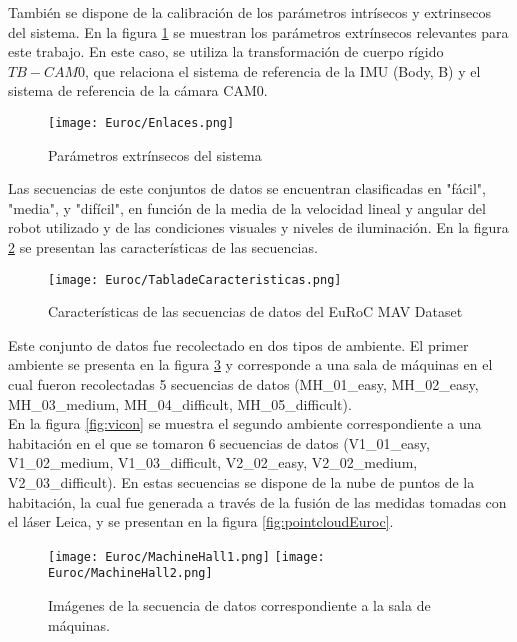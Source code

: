 También se dispone de la calibración de los parámetros intrísecos y extrinsecos del sistema. En la figura \ref{fig:extrinsecosEuroc} se muestran los parámetros extrínsecos relevantes para este trabajo. En este caso, se utiliza la transformación de cuerpo rígido $T{B-CAM0}$, que relaciona el sistema de referencia de la IMU (Body, B) y el sistema de referencia de la cámara CAM0. 



\begin{figure}[H]
	\centering
	\texttt{[image: Euroc/Enlaces.png]}
	\caption{Parámetros extrínsecos del sistema}
	\label{fig:extrinsecosEuroc}
\end{figure}

Las secuencias de este conjuntos de datos se encuentran clasificadas en "fácil", "media", y "difícil",  en función de la media de la velocidad lineal y angular del robot utilizado y de las condiciones visuales y niveles de iluminación. En la figura \ref{fig:tablaDeCaracteristicas} se presentan las características de las secuencias. 

\begin{figure}[H]
	\centering
	\texttt{[image: Euroc/TabladeCaracteristicas.png]}
	\caption{Características de las secuencias de datos del EuRoC MAV Dataset}
	\label{fig:tablaDeCaracteristicas}
\end{figure}



Este conjunto de datos fue recolectado en dos tipos de ambiente. El primer ambiente se presenta en la figura \ref{fig:machineHall} y  corresponde a una sala de máquinas en el cual fueron recolectadas 5 secuencias de datos (MH\_01\_easy, MH\_02\_easy, MH\_03\_medium, MH\_04\_difficult, MH\_05\_difficult). \\

En la figura \ref{fig:vicon} se muestra el segundo ambiente correspondiente a una habitación en el que se tomaron 6 secuencias de datos (V1\_01\_easy, V1\_02\_medium, V1\_03\_difficult, V2\_02\_easy, V2\_02\_medium, V2\_03\_difficult). En estas secuencias se dispone de la nube de puntos de la habitación, la cual fue generada a través de la fusión de las medidas tomadas con el láser Leica, y se presentan en la figura \ref{fig:pointcloudEuroc}.\\

\begin{figure}[H]
	\centering
	\texttt{[image: Euroc/MachineHall1.png]}
	\texttt{[image: Euroc/MachineHall2.png]}
	\caption{Imágenes de la secuencia de datos correspondiente a la sala de máquinas.}
	\label{fig:machineHall}
\end{figure}


